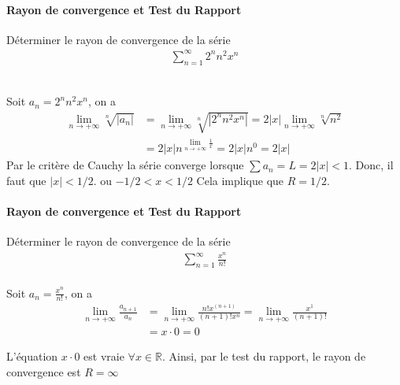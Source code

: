 \documentclass{report}
\begin{document}
\begin{multicols*}{2}
  \paragraph{Rayon de convergence et Test du Rapport}
      Déterminer le rayon de convergence de la série
      \begin{align*}
          \sum_{n=1}^{\infty }2^nn^2x^n
      \end{align*}
  
  \mbox{}\\ 
  Soit $a_n = 2^nn^2x^n$, on a 
  \begin{align*}
      \lim\limits_{n \to+\infty }\sqrt[n]{|a_n|}  &= 
      \lim\limits_{n \to+\infty }\sqrt[n]{|2^nn^2x^n|}  = 2|x|
      \lim\limits_{n \to+\infty }\sqrt[n]{n^2}  \\ 
                                      &= 
      2|x|n^{\lim\limits_{n \to+\infty } \frac{1}{x}} = 2|x|n^0 = 2|x|
  \end{align*}
  Par le critère de Cauchy la série converge lorsque 
  $\sum a_n = L = 2|x| < 1$. Donc, il faut que $|x| < 1/2$. 
  ou $ -1/2 < x < 1/2 $  
  Cela implique que $R = 1/2$. 


  \paragraph{Rayon de convergence et Test du Rapport}
      Déterminer le rayon de convergence de la série
      \begin{align*}
          \sum_{n=1}^{\infty }\frac{x^n}{n!} 
      \end{align*} 
  \mbox{}\\ 

  Soit $a_n = \frac{x^n}{n!} $, on a 
  \begin{align*}
    \lim\limits_{n \to+\infty }\frac{a_{n+1}}{a_n}   &= 
    \lim\limits_{n\to+\infty } \frac{n! x^{(n+1)}}{(n+1)!x^n}= 
    \lim\limits_{n\to+\infty } \frac{x^{1}}{(n+1)!} \\ 
                                          &= x \cdot 0 = 0
  \end{align*}

  L'équation $x \cdot 0$ est vraie $\forall x \in \mathbb{R}$. Ainsi, 
  par le test du rapport, le rayon de convergence est $R = \infty$




  








 









\end{multicols*}
\end{document}
